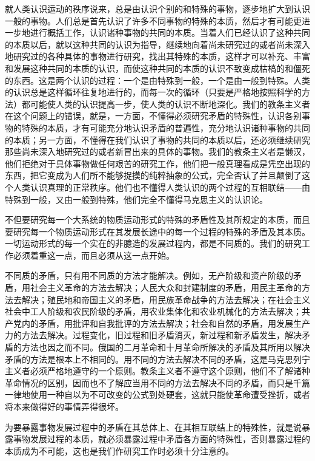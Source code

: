 就人类认识运动的秩序说来，总是由认识个别的和特殊的事物，逐步地扩大到认识一般的事物。人们总是首先认识了许多不同事物的特殊的本质，然后才有可能更进一步地进行概括工作，认识诸种事物的共同的本质。当着人们已经认识了这种共同的本质以后，就以这种共同的认识为指导，继续地向着尚未研究过的或者尚未深入地研究过的各种具体的事物进行研究，找出其特殊的本质，这样才可以补充、丰富和发展这种共同的本质的认识，而使这种共同的本质的认识不致变成枯槁的和僵死的东西。这是两个认识的过程：一个是由特殊到一般，一个是由一般到特殊。人类的认识总是这样循环往复地进行的，而每一次的循环（只要是严格地按照科学的方法）都可能使人类的认识提高一步，使人类的认识不断地深化。我们的教条主义者在这个问题上的错误，就是，一方面，不懂得必须研究矛盾的特殊性，认识各别事物的特殊的本质，才有可能充分地认识矛盾的普遍性，充分地认识诸种事物的共同的本质；另一方面，不懂得在我们认识了事物的共同的本质以后，还必须继续研究那些尚未深入地研究过的或者新冒出来的具体的事物。我们的教条主义者是懒汉，他们拒绝对于具体事物做任何艰苦的研究工作，他们把一般真理看成是凭空出现的东西，把它变成为人们所不能够捉摸的纯粹抽象的公式，完全否认了并且颠倒了这个人类认识真理的正常秩序。他们也不懂得人类认识的两个过程的互相联结——由特殊到一般，又由一般到特殊，他们完全不懂得马克思主义的认识论。

不但要研究每一个大系统的物质运动形式的特殊的矛盾性及其所规定的本质，而且要研究每一个物质运动形式在其发展长途中的每一个过程的特殊的矛盾及其本质。一切运动形式的每一个实在的非臆造的发展过程内，都是不同质的。我们的研究工作必须着重这一点，而且必须从这一点开始。

不同质的矛盾，只有用不同质的方法才能解决。例如，无产阶级和资产阶级的矛盾，用社会主义革命的方法去解决；人民大众和封建制度的矛盾，用民主革命的方法去解决；殖民地和帝国主义的矛盾，用民族革命战争的方法去解决；在社会主义社会中工人阶级和农民阶级的矛盾，用农业集体化和农业机械化的方法去解决；共产党内的矛盾，用批评和自我批评的方法去解决；社会和自然的矛盾，用发展生产力的方法去解决。过程变化，旧过程和旧矛盾消灭，新过程和新矛盾发生，解决矛盾的方法也因之而不同。俄国的二月革命和十月革命所解决的矛盾及其所用以解决矛盾的方法是根本上不相同的。用不同的方法去解决不同的矛盾，这是马克思列宁主义者必须严格地遵守的一个原则。教条主义者不遵守这个原则，他们不了解诸种革命情况的区别，因而也不了解应当用不同的方法去解决不同的矛盾，而只是千篇一律地使用一种自以为不可改变的公式到处硬套，这就只能使革命遭受挫折，或者将本来做得好的事情弄得很坏。

为要暴露事物发展过程中的矛盾在其总体上、在其相互联结上的特殊性，就是说暴露事物发展过程的本质，就必须暴露过程中矛盾各方面的特殊性，否则暴露过程的本质成为不可能，这也是我们作研究工作时必须十分注意的。

